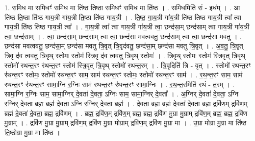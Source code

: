 \documentclass[17pt]{extarticle}
\begin{document}
1. स॒मिध॒ मा स॒मिधꣳ॑ स॒मिध॒ मा ति॑ष्ठ ति॒ष्ठा स॒मिधꣳ॑ स॒मिध॒ मा ति॑ष्ठ । . स॒मिध॒मिति॑ सं - इध᳚म् । . आ ति॑ष्ठ ति॒ष्ठा ति॑ष्ठ गाय॒त्री गा॑य॒त्री ति॒ष्ठा ति॑ष्ठ गाय॒त्री । . ति॒ष्ठ॒ गा॒य॒त्री गा॑य॒त्री ति॑ष्ठ तिष्ठ गाय॒त्री त्वा᳚ त्वा गाय॒त्री ति॑ष्ठ तिष्ठ गाय॒त्री त्वा᳚ । . गा॒य॒त्री त्वा᳚ त्वा गाय॒त्री गा॑य॒त्री त्वा॒ छन्द॑सा॒म् छन्द॑साम् त्वा गाय॒त्री गा॑य॒त्री त्वा॒ छन्द॑साम् । . त्वा॒ छन्द॑सा॒म् छन्द॑साम् त्वा त्वा॒ छन्द॑सा मवत्ववतु॒ छन्द॑साम् त्वा त्वा॒ छन्द॑सा मवतु । . छन्द॑सा मवत्ववतु॒ छन्द॑सा॒म् छन्द॑सा मवतु त्रि॒वृत् त्रि॒वृद॑वतु॒ छन्द॑सा॒म् छन्द॑सा मवतु त्रि॒वृत् । . अ॒व॒तु॒ त्रि॒वृत् त्रि॒वृ द॑व त्ववतु त्रि॒वृथ् स्तोमः॒ स्तोम॑ स्त्रि॒वृ द॑व त्ववतु त्रि॒वृथ् स्तोमः॑ । . त्रि॒वृथ् स्तोमः॒ स्तोम॑ स्त्रि॒वृत् त्रि॒वृथ् स्तोमो॑ रथन्त॒रꣳ र॑थन्त॒रꣳ स्तोम॑ स्त्रि॒वृत् त्रि॒वृथ् स्तोमो॑ रथन्त॒रम् । . त्रि॒वृदिति॑ त्रि - वृत् । . स्तोमो॑ रथन्त॒रꣳ र॑थन्त॒रꣳ स्तोमः॒ स्तोमो॑ रथन्त॒रꣳ साम॒ साम॑ रथन्त॒रꣳ स्तोमः॒ स्तोमो॑ रथन्त॒रꣳ साम॑ । . र॒थ॒न्त॒रꣳ साम॒ साम॑ रथन्त॒रꣳ र॑थन्त॒रꣳ सामा॒ग्नि र॒ग्निः साम॑ रथन्त॒रꣳ र॑थन्त॒रꣳ सामा॒ग्निः । . र॒थ॒न्त॒रमिति॑ रथं - त॒रम् । . सामा॒ग्नि र॒ग्निः साम॒ सामा॒ग्निर् दे॒वता॑ दे॒वता॒ ऽग्निः साम॒ सामा॒ग्निर् दे॒वता᳚ । . अ॒ग्निर् दे॒वता॑ दे॒वता॒ ऽग्नि र॒ग्निर् दे॒वता॒ ब्रह्म॒ ब्रह्म॑ दे॒वता॒ ऽग्नि र॒ग्निर् दे॒वता॒ ब्रह्म॑ । . दे॒वता॒ ब्रह्म॒ ब्रह्म॑ दे॒वता॑ दे॒वता॒ ब्रह्म॒ द्रवि॑ण॒म् द्रवि॑ण॒म् ब्रह्म॑ दे॒वता॑ दे॒वता॒ ब्रह्म॒ द्रवि॑णम् । . ब्रह्म॒ द्रवि॑ण॒म् द्रवि॑ण॒म् ब्रह्म॒ ब्रह्म॒ द्रवि॑ण मु॒ग्रा मु॒ग्राम् द्रवि॑ण॒म् ब्रह्म॒ ब्रह्म॒ द्रवि॑ण मु॒ग्राम् । . द्रवि॑ण मु॒ग्रा मु॒ग्राम् द्रवि॑ण॒म् द्रवि॑ण मु॒ग्रा मोग्राम् द्रवि॑ण॒म् द्रवि॑ण मु॒ग्रा मा । . उ॒ग्रा मोग्रा मु॒ग्रा मा ति॑ष्ठ ति॒ष्ठोग्रा मु॒ग्रा मा ति॑ष्ठ । \newline
\end{document}
